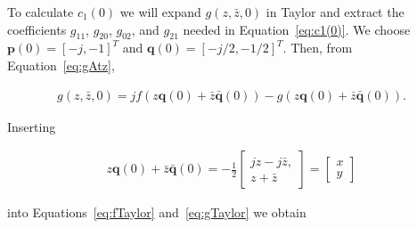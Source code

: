 \documentclass{article}
\theoremstyle{lemma}
\begin{document}
To calculate $c_1(0)$ we will expand $g(z,\bar{z},0)$ in Taylor and extract
the coefficients $g_{11}$, $g_{20}$, $g_{02}$, and $g_{21}$ needed in
Equation~\ref{eq:c1(0)}.
%
We choose $\mathbf{p}(0)=[-j,-1]^T$ and $\mathbf{q}(0)=[-j/2,-1/2]^T$. Then,
from Equation~\ref{eq:gAtz},

\begin{align}
g(z,\bar{z},0)=jf(z\mathbf{q}(0)+\bar{z}\mathbf{\bar{q}}(0))-g(z\mathbf{q}(0)+\bar{z}\mathbf{\bar{q}}(0)).
\end{align}

Inserting

\begin{align}
z\mathbf{q}(0)+\bar{z}\mathbf{\bar{q}}(0)=-\frac{1}{2}\left[\begin{array}{c}
                                                             jz-j\bar{z},\\
                                                             z+\bar{z}
                                                            \end{array}\right]=
\left[\begin{array}{c}
       x\\
       y
      \end{array}\right]\nonumber
\end{align}

\noindent into Equations~\ref{eq:fTaylor} and~\ref{eq:gTaylor} we obtain
\end{document}
